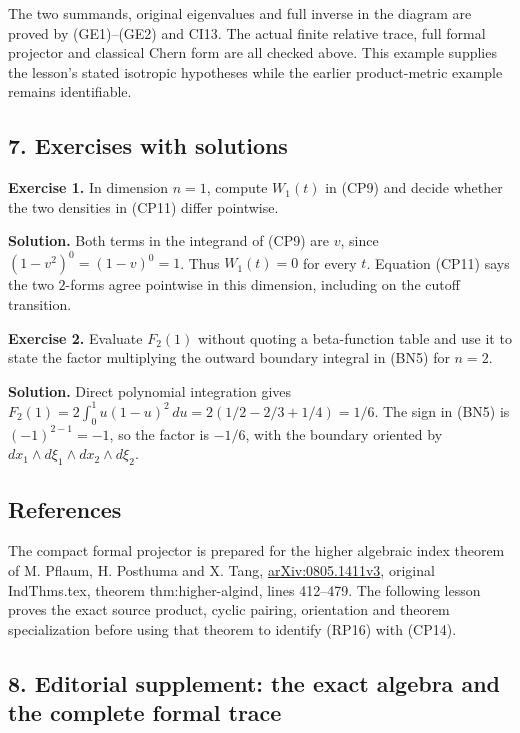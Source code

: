 \documentclass[
  11pt,
]{article}
\begin{document}
The two summands, original eigenvalues and full inverse in the diagram
are proved by (GE1)--(GE2) and CI13. The actual finite relative trace,
full formal projector and classical Chern form are all checked above.
This example supplies the lesson's stated isotropic hypotheses while the
earlier product-metric example remains identifiable.

\subsection{7. Exercises with solutions}\label{exercises-with-solutions}

\textbf{Exercise 1.} In dimension \(n=1\), compute \(W_1(t)\) in (CP9)
and decide whether the two densities in (CP11) differ pointwise.

\textbf{Solution.} Both terms in the integrand of (CP9) are \(v\), since
\((1-v^2)^0=(1-v)^0=1\). Thus \(W_1(t)=0\) for every \(t\). Equation
(CP11) says the two \(2\)-forms agree pointwise in this dimension,
including on the cutoff transition.

\textbf{Exercise 2.} Evaluate \(F_2(1)\) without quoting a beta-function
table and use it to state the factor multiplying the outward boundary
integral in (BN5) for \(n=2\).

\textbf{Solution.} Direct polynomial integration gives
\(F_2(1)=2\int_0^1 u(1-u)^2\,du
=2(1/2-2/3+1/4)=1/6\). The sign in (BN5) is \((-1)^{2-1}=-1\), so the
factor is \(-1/6\), with the boundary oriented by
\(dx_1\wedge d\xi_1\wedge dx_2\wedge d\xi_2\).

\subsection{References}\label{references}

The compact formal projector is prepared for the higher algebraic index
theorem of M. Pflaum, H. Posthuma and X. Tang,
\href{https://arxiv.org/abs/0805.1411}{arXiv:0805.1411v3}, original
IndThms.tex, theorem thm:higher-algind, lines 412--479. The following
lesson proves the exact source product, cyclic pairing, orientation and
theorem specialization before using that theorem to identify (RP16) with
(CP14).

\subsection{8. Editorial supplement: the exact algebra and the complete
formal
trace}\label{editorial-supplement-the-exact-algebra-and-the-complete-formal-trace}
\end{document}
